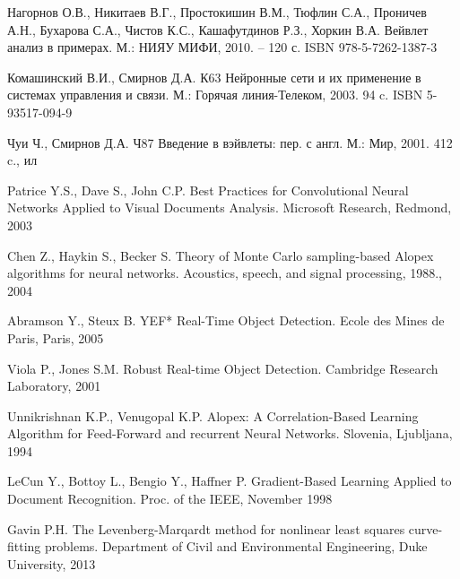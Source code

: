 \documentclass[utf8,usehyperref,14pt]{G7-32}
\begin{document}
\begin{thebibliography}{1} %

{Нагорнов} О.В., {Никитаев} В.Г., {Простокишин} В.М., {Тюфлин} С.А., {Проничев} А.Н., {Бухарова} С.А., {Чистов} К.С., {Кашафутдинов} Р.З., {Хоркин} В.А.
\newblock Вейвлет анализ в примерах.
\newblock М.: НИЯУ МИФИ, 2010. – 120 с. ISBN 978-5-7262-1387-3

{Комашинский} В.И., {Смирнов} Д.А.
\newblock К63 Нейронные сети и их применение в системах управления и связи.
\newblock М.: Горячая линия-Телеком, 2003. 94 c. ISBN 5-93517-094-9

{Чуи} Ч., {Смирнов} Д.А.
\newblock Ч87 Введение в вэйвлеты: пер. с англ.
\newblock М.: Мир, 2001. 412 c., ил

{Patrice} Y.S., {Dave} S., {John} C.P.  
\newblock Best Practices for Convolutional Neural Networks Applied to Visual Documents Analysis.
\newblock Microsoft Research, Redmond, 2003

{Chen} Z., {Haykin} S., {Becker} S.  
\newblock Theory of Monte Carlo sampling-based Alopex algorithms for neural networks.
\newblock Acoustics, speech, and signal processing, 1988., 2004

{Abramson} Y., {Steux} B.
\newblock YEF* Real-Time Object Detection.
\newblock Ecole des Mines de Paris, Paris, 2005

{Viola} P., {Jones} S.M.
\newblock Robust Real-time Object Detection.
\newblock Cambridge Research Laboratory, 2001

{Unnikrishnan} K.P., {Venugopal} K.P.
\newblock Alopex: A Correlation-Based Learning Algorithm for Feed-Forward and recurrent Neural Networks.
\newblock Slovenia, Ljubljana, 1994

{LeCun} Y., {Bottoy} L., {Bengio} Y., {Haffner} P.  
\newblock Gradient-Based Learning Applied to Document Recognition.
\newblock Proc. of the IEEE, November 1998

{Gavin} P.H.
\newblock The Levenberg-Marqardt method for nonlinear least squares curve-fitting problems.
\newblock Department of Civil and Environmental Engineering, Duke University, 2013



\end{thebibliography}
\end{document}
